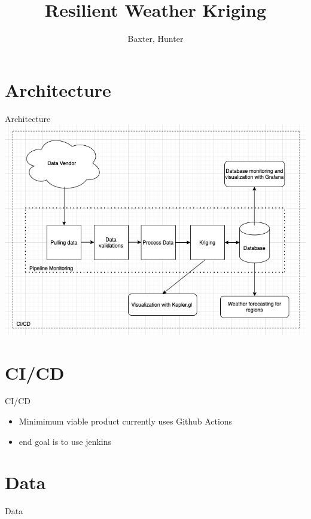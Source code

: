 \documentclass{beamer}
\title{Resilient Weather Kriging}
\author{
    Baxter, Hunter %
}
\begin{document}
\maketitle

\section{Architecture}
\begin{frame}{Architecture}
\includegraphics[width=\linewidth]{figures/architecture.png}
\end{frame}

\section{CI/CD}
\begin{frame}{CI/CD}
\begin{itemize}
    \item Minimimum viable product currently uses Github Actions
    \item end goal is to use jenkins
\end{itemize}
    
\end{frame}

\section{Data}
\begin{frame}{Data}
\end{frame}
\end{document}
